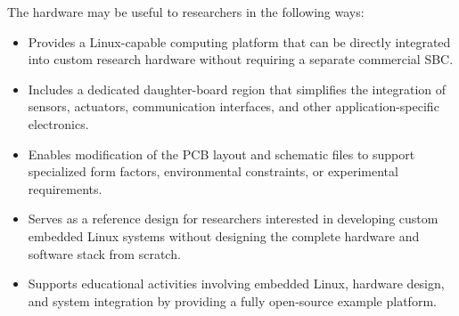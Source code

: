 The hardware may be useful to researchers in the following ways:

\begin{itemize}
\item Provides a Linux-capable computing platform that can be directly integrated into 
custom research hardware without requiring a separate commercial SBC.

\item Includes a dedicated daughter-board region that simplifies the integration of sensors, 
actuators, communication interfaces, and other application-specific electronics.

\item Enables modification of the PCB layout and schematic files to support specialized form factors, 
environmental constraints, or experimental requirements.

\item Serves as a reference design for researchers interested in developing custom 
embedded Linux systems without designing the complete hardware and software stack from scratch.

\item Supports educational activities involving embedded Linux, hardware design, 
and system integration by providing a fully open-source example platform.

\end{itemize}
